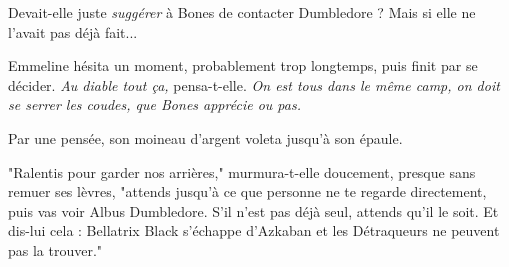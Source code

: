 Devait-elle juste \emph{suggérer}  à Bones de contacter Dumbledore ? Mais si elle ne l'avait pas déjà fait...

Emmeline hésita un moment, probablement trop longtemps, puis finit par se décider. \emph{Au diable tout ça, } pensa-t-elle. \emph{On est tous dans le même camp, on doit se serrer les coudes, que Bones apprécie ou pas.} 

Par une pensée, son moineau d'argent voleta jusqu'à son épaule.

"Ralentis pour garder nos arrières," murmura-t-elle doucement, presque sans remuer ses lèvres, "attends jusqu'à ce que personne ne te regarde directement, puis vas voir Albus Dumbledore. S'il n'est pas déjà seul, attends qu'il le soit. Et dis-lui cela : Bellatrix Black s'échappe d'Azkaban et les Détraqueurs ne peuvent pas la trouver."

